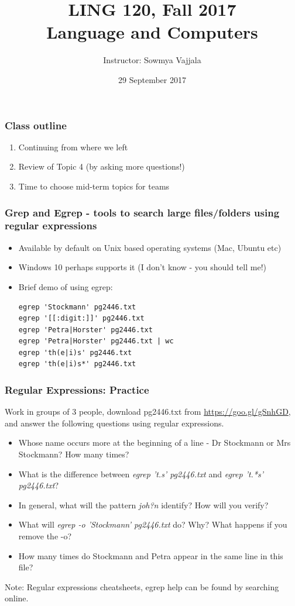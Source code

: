 \documentclass{beamer}
\author[Sowmya Vajjala]{Instructor: Sowmya Vajjala}
\title[LING 120]{LING 120, Fall 2017 \\ Language and Computers}
\date{29 September 2017}
\institute{Iowa State University, USA}
\begin{document}
\begin{frame}\titlepage
\end{frame}

\begin{frame}
\frametitle{Class outline}%
\begin{enumerate}
\item Continuing from where we left
\item Review of Topic 4 (by asking more questions!)
\item Time to choose mid-term topics for teams
\end{enumerate}
\end{frame} %

\begin{frame}[fragile]
\frametitle{Grep and Egrep - tools to search large files/folders using regular expressions}
\begin{itemize}
\item Available by default on Unix based operating systems (Mac, Ubuntu etc)
\item Windows 10 perhaps supports it (I don't know - you should tell me!) \pause
\item Brief demo of using egrep:
\begin{verbatim}
egrep 'Stockmann' pg2446.txt
egrep '[[:digit:]]' pg2446.txt
egrep 'Petra|Horster' pg2446.txt
egrep 'Petra|Horster' pg2446.txt | wc
egrep 'th(e|i)s' pg2446.txt
egrep 'th(e|i)s*' pg2446.txt
\end{verbatim}
\end{itemize}
\end{frame}

\begin{frame}
\frametitle{Regular Expressions: Practice}
Work in groups of 3 people, download pg2446.txt from \url{https://goo.gl/gSnhGD}, and answer the following questions using regular expressions.
\begin{itemize}
\item Whose name occurs more at the beginning of a line - Dr Stockmann or Mrs Stockmann? How many times?
\item What is the difference between \textit{egrep 't.s' pg2446.txt} and \textit{egrep 't.*s' pg2446.txt}?
\item In general, what will the pattern \textit{joh?n} identify? How will you verify?
\item What will \textit{egrep -o 'Stockmann' pg2446.txt} do? Why? What happens if you remove the -o?
\item How many times do Stockmann and Petra appear in the same line in this file?
\end{itemize}
Note: Regular expressions cheatsheets, egrep help can be found by searching online. 
\end{frame}
\end{document}
